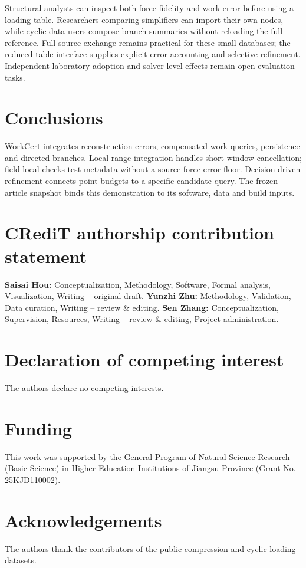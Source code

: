 \documentclass[preprint,12pt,a4paper]{elsarticle}
\begin{document}
Structural analysts can inspect both force fidelity and work error before using a loading table. Researchers comparing simplifiers can import their own nodes, while cyclic-data users compose branch summaries without reloading the full reference. Full source exchange remains practical for these small databases; the reduced-table interface supplies explicit error accounting and selective refinement. Independent laboratory adoption and solver-level effects remain open evaluation tasks.

\section{Conclusions}
WorkCert integrates reconstruction errors, compensated work queries, persistence and directed branches. Local range integration handles short-window cancellation; field-local checks test metadata without a source-force error floor. Decision-driven refinement connects point budgets to a specific candidate query. The frozen article snapshot binds this demonstration to its software, data and build inputs.

\section*{CRediT authorship contribution statement}
\textbf{Saisai Hou:} Conceptualization, Methodology, Software, Formal analysis, Visualization, Writing -- original draft.
\textbf{Yunzhi Zhu:} Methodology, Validation, Data curation, Writing -- review \& editing.
\textbf{Sen Zhang:} Conceptualization, Supervision, Resources, Writing -- review \& editing, Project administration.
\section*{Declaration of competing interest}
The authors declare no competing interests.
\section*{Funding}
This work was supported by the General Program of Natural Science Research (Basic Science) in Higher Education Institutions of Jiangsu Province (Grant No. 25KJD110002).
\section*{Acknowledgements}
The authors thank the contributors of the public compression and cyclic-loading datasets.
\end{document}
